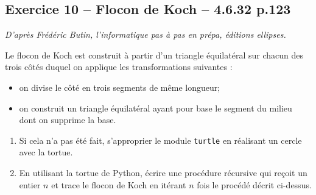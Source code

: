\documentclass[10pt,fleqn]{article} %
\begin{document}
\begin{multicols}{2}
\subsection*{Exercice 10 -- Flocon de Koch -- 4.6.32 p.123}
\begin{flushright}
\textit{D'après Frédéric Butin, l'informatique pas à pas en prépa, éditions ellipses.}
\end{flushright}
Le flocon de Koch est construit à partir d'un triangle équilatéral sur chacun des trois côtés duquel on applique les transformations suivantes : 
\begin{itemize}
\item on divise le côté en trois segments de même longueur;
\item on construit un triangle équilatéral ayant pour base le segment du milieu dont on supprime la base.
\end{itemize}
\begin{enumerate}
\item Si cela n'a pas été fait, s'approprier le module \texttt{turtle} en réalisant un cercle avec la tortue.
\item En utilisant la tortue de Python, écrire une procédure récursive qui reçoit un entier $n$ et trace le flocon de Koch en itérant $n$ fois le procédé décrit ci-dessus.
\end{enumerate}


\end{multicols}
\end{document}
